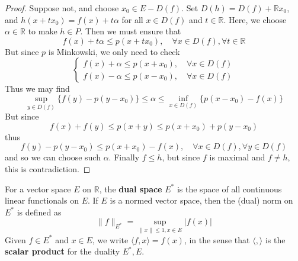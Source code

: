 \begin{proof}
Suppose not, and choose $x_0\in E-D(f)$. Set $D(h)=D(f)+\mathbb{R}x_0$, and $h(x+tx_0)=f(x)+t\alpha$ for all $x\in D(f)$ and $t\in \mathbb{R}$. Here, we choose $\alpha\in \mathbb{R}$ to make $h\in P$. Then we must ensure that
\begin{equation}
f(x)+t\alpha\leq p(x+tx_0),\quad \forall x\in D(f),\forall t\in \mathbb{R}
\end{equation}
But since $p$ is Minkowski, we only need to check
\begin{equation}
\begin{cases}
f(x)+\alpha \leq p(x+x_0),\quad \forall x\in D(f)\\
f(x)-\alpha\leq p(x-x_0),\quad \forall x\in D(f)
\end{cases}
\end{equation}
Thus we may find
\begin{equation}
\sup_{y\in D(f)}\{f(y)-p(y-x_0)\}\leq \alpha\leq \inf_{x\in D(f)} \{p(x-x_0)-f(x)\}
\end{equation}
But since
\begin{equation}
f(x)+f(y)\leq p(x+y)\leq p(x+x_0)+p(y-x_0)
\end{equation}
thus
\begin{equation}
f(y)-p(y-x_0)\leq p(x+x_0)-f(x), \quad \forall x\in D(f),\forall y\in D(f)
\end{equation}
and so we can choose such $\alpha$. Finally $f\leq h$, but since $f$ is maximal and $f\neq h$, this is contradiction.
\end{proof}

\begin{defn} For a vector space $E$ on $\mathbb{R}$, the \textbf{dual space} $E^*$ is the space of all continuous linear functionals on $E$. If $E$ is a normed vector space, then the (dual) norm on $E^*$ is defined as
\begin{equation}
\|f\|_{E^*}=\sup_{\|x\|\leq 1, x\in E}|f(x)|
\end{equation}
Given $f\in E^*$ and $x\in E$, we write $\langle f,x\rangle=f(x)$, in the sense that $\langle,\rangle$ is the \textbf{scalar product} for the duality $E^*,E$.
\end{defn}

